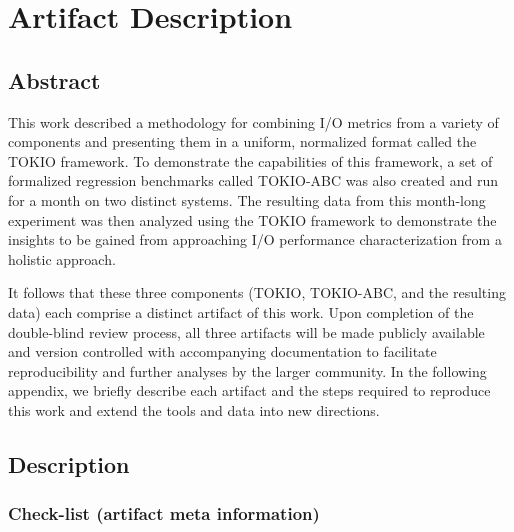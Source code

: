 \appendix

\section{Artifact Description} \label{sec:appendix/artifacts}


\subsection{Abstract}

This work described a methodology for combining I/O metrics from a variety of components and presenting them in a uniform, normalized format called the TOKIO framework.
To demonstrate the capabilities of this framework, a set of formalized regression benchmarks called TOKIO-ABC was also created and run for a month on two distinct systems.
The resulting data from this month-long experiment was then analyzed using the TOKIO framework to demonstrate the insights to be gained from approaching I/O performance characterization from a holistic approach.

It follows that these three components (TOKIO, TOKIO-ABC, and the resulting data) each comprise a distinct artifact of this work.  Upon completion of the double-blind review process, all three artifacts will be made publicly available and version controlled with accompanying documentation to facilitate reproducibility and further analyses by the larger community.  In the following appendix, we briefly describe each artifact and the steps required to reproduce this work and extend the tools and data into new directions.

\subsection{Description}

\subsubsection{Check-list (artifact meta information)}

